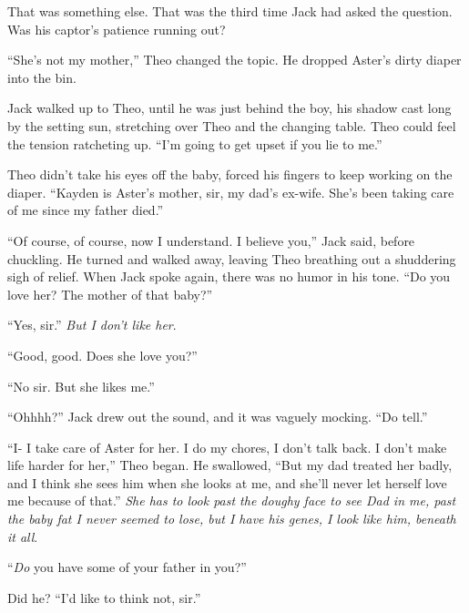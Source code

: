 That was something else.  That was the third time Jack had asked the question.  Was his captor's patience running out?



``She's not my mother,'' Theo changed the topic.  He dropped Aster's dirty diaper into the bin.



Jack walked up to Theo, until he was just behind the boy, his shadow cast long by the setting sun, stretching over Theo and the changing table.  Theo could feel the tension ratcheting up.  ``I'm going to get upset if you lie to me.''



Theo didn't take his eyes off the baby, forced his fingers to keep working on the diaper.  ``Kayden is Aster's mother, sir, my dad's ex-wife.  She's been taking care of me since my father died.''



``Of course, of course, now I understand.  I believe you,'' Jack said, before chuckling.  He turned and walked away, leaving Theo breathing out a shuddering sigh of relief.  When Jack spoke again, there was no humor in his tone.  ``Do you love her?  The mother of that baby?''



``Yes, sir.''  \emph{But I don't like her}.



``Good, good.  Does she love you?''



``No sir.  But she likes me.''



``Ohhhh?'' Jack drew out the sound, and it was vaguely mocking.  ``Do tell.''



``I- I take care of Aster for her.  I do my chores, I don't talk back.  I don't make life harder for her,'' Theo began.  He swallowed, ``But my dad treated her badly, and I think she sees him when she looks at me, and she'll never let herself love me because of that.''  \emph{She has to look past the doughy face to see Dad in me, past the baby fat I never seemed to lose, but I have his genes, I look like him, beneath it all}.



``\emph{Do} you have some of your father in you?''



Did he?  ``I'd like to think not, sir.''



